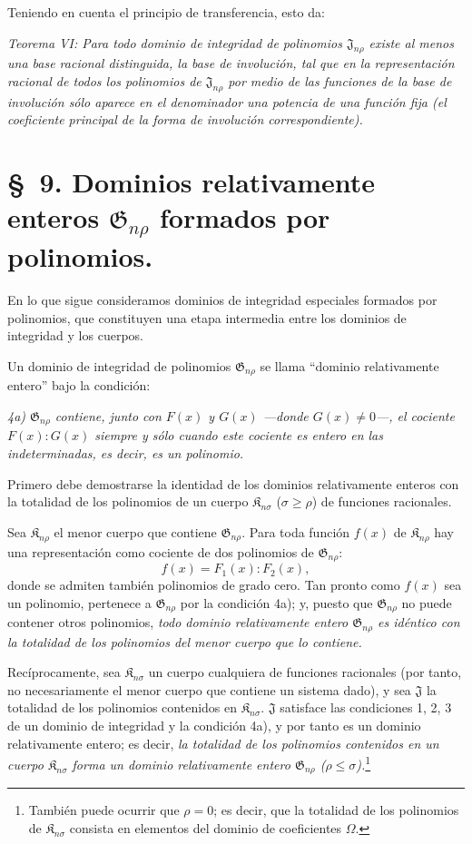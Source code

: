 \documentclass[11pt]{article}
\providecommand{\Kfield}{\mathfrak{K}}
\providecommand{\Jdom}{\mathfrak{J}}
\providecommand{\Gdom}{\mathfrak{G}}
\begin{document}
Teniendo en cuenta el principio de transferencia, esto da:

\emph{Teorema VI: Para todo dominio de integridad de polinomios $\Jdom_{n\rho}$ existe al menos una base racional distinguida, la base de involución, tal que en la representación racional de todos los polinomios de $\Jdom_{n\rho}$ por medio de las funciones de la base de involución sólo aparece en el denominador una potencia de una función fija (el coeficiente principal de la forma de involución correspondiente).}

\section*{\S\ 9. Dominios relativamente enteros $\Gdom_{n\rho}$ formados por polinomios.}

En lo que sigue consideramos dominios de integridad especiales formados por polinomios, que constituyen una etapa intermedia entre los dominios de integridad y los cuerpos.

Un dominio de integridad de polinomios $\Gdom_{n\rho}$ se llama ``dominio relativamente entero'' bajo la condición:

\emph{4a) $\Gdom_{n\rho}$ contiene, junto con $F(x)$ y $G(x)$ ---donde $G(x)\ne0$---, el cociente $F(x):G(x)$ siempre y sólo cuando este cociente es entero en las indeterminadas, es decir, es un polinomio.}

Primero debe demostrarse la identidad de los dominios relativamente enteros con la totalidad de los polinomios de un cuerpo $\Kfield_{n\sigma}$ ($\sigma\ge\rho$) de funciones racionales.

Sea $\Kfield_{n\rho}$ el menor cuerpo que contiene $\Gdom_{n\rho}$. Para toda función $f(x)$ de $\Kfield_{n\rho}$ hay una representación como cociente de dos polinomios de $\Gdom_{n\rho}$:
\[
  f(x)=F_1(x):F_2(x),
\]
donde se admiten también polinomios de grado cero. Tan pronto como $f(x)$ sea un polinomio, pertenece a $\Gdom_{n\rho}$ por la condición 4a); y, puesto que $\Gdom_{n\rho}$ no puede contener otros polinomios, \emph{todo dominio relativamente entero $\Gdom_{n\rho}$ es idéntico con la totalidad de los polinomios del menor cuerpo que lo contiene.}

Recíprocamente, sea $\Kfield_{n\sigma}$ un cuerpo cualquiera de funciones racionales (por tanto, no necesariamente el menor cuerpo que contiene un sistema dado), y sea $\Jdom$ la totalidad de los polinomios contenidos en $\Kfield_{n\sigma}$. $\Jdom$ satisface las condiciones 1, 2, 3 de un dominio de integridad y la condición 4a), y por tanto es un dominio relativamente entero; es decir, \emph{la totalidad de los polinomios contenidos en un cuerpo $\Kfield_{n\sigma}$ forma un dominio relativamente entero $\Gdom_{n\rho}$ ($\rho\le\sigma$).}\footnote{También puede ocurrir que $\rho=0$; es decir, que la totalidad de los polinomios de $\Kfield_{n\sigma}$ consista en elementos del dominio de coeficientes $\Omega$.}
\end{document}
